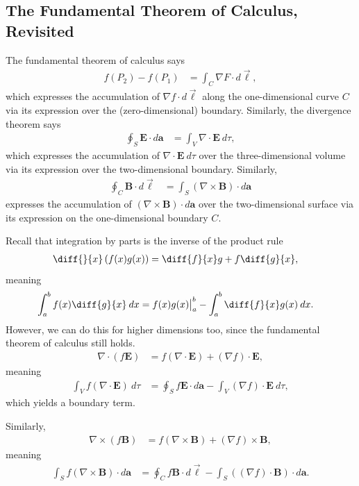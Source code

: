 \documentclass[10pt]{mypackage}
\begin{document}
\subsection{The Fundamental Theorem of Calculus, Revisited}%
The fundamental theorem of calculus says
\begin{align*}
  f\left(P_2\right) - f\left(P_1\right) &= \int_{C}\nabla F \cdot d\vec{\ell},
\end{align*}
which expresses the accumulation of $\nabla f \cdot d\vec{\ell}$ along the one-dimensional curve $C$ via its expression over the (zero-dimensional) boundary. Similarly, the divergence theorem says
\begin{align*}
  \oint_{S}\mathbf{E}\cdot d\mathbf{a} &= \int_{V}\nabla \cdot \mathbf{E}\:d\tau,
\end{align*}
which expresses the accumulation of $\nabla \cdot \mathbf{E}\:d\tau$ over the three-dimensional volume via its expression over the two-dimensional boundary. Similarly,
\begin{align*}
  \oint_{C}\mathbf{B}\cdot d\vec{\ell} &= \int_{S}\left(\nabla \times \mathbf{B}\right)\cdot d\mathbf{a}
\end{align*}
expresses the accumulation of $\left(\nabla \times \mathbf{B}\right)\cdot d\mathbf{a}$ over the two-dimensional surface via its expression on the one-dimensional boundary $C$.
\begin{example}
  Recall that integration by parts is the inverse of the product rule
  \begin{align*}
    \diff{}{x}\left(f(x)g(x)\right) &= \diff{f}{x}g + f\diff{g}{x},
  \end{align*}
  meaning
  \begin{align*}
    \int_{a}^{b} f(x)\diff{g}{x}\:dx &= f(x)g(x)\bigr\vert_{a}^{b} - \int_{a}^{b} \diff{f}{x}g(x)\:dx.
  \end{align*}
  However, we can do this for higher dimensions too, since the fundamental theorem of calculus still holds.
  \begin{align*}
    \nabla \cdot \left(f\mathbf{E}\right) &= f\left(\nabla \cdot \mathbf{E}\right) + \left(\nabla f\right)\cdot \mathbf{E},
  \end{align*}
  meaning
  \begin{align*}
    \int_{V} f\left(\nabla \cdot \mathbf{E}\right)\:d\tau &= \oint_{S}f\mathbf{E}\cdot d\mathbf{a} - \int_{V}\left(\nabla f\right)\cdot \mathbf{E}\:d\tau,
  \end{align*}
  which yields a boundary term.\newline

  Similarly,
  \begin{align*}
    \nabla\times \left(f\mathbf{B}\right) &= f\left(\nabla \times \mathbf{B}\right) + \left(\nabla f\right)\times \mathbf{B},
  \end{align*}
  meaning
  \begin{align*}
    \int_{S}f\left(\nabla \times \mathbf{B}\right)\cdot d\mathbf{a} &= \oint_{C}f\mathbf{B}\cdot d\vec{\ell} - \int_{S}^{} \left(\left(\nabla f\right)\cdot \mathbf{B}\right)\cdot d\mathbf{a}.
  \end{align*}
\end{example}
\end{document}
